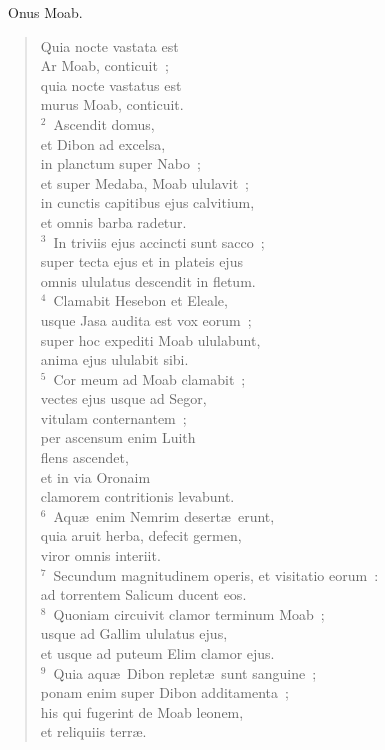 ~Onus Moab. \begin{flushleft}\begin{verse}\vspace{6pt}Quia nocte vastata est\\ Ar Moab, conticuit~;\\ quia nocte vastatus est\\ murus Moab, conticuit.\\
${}^{2}$~Ascendit domus,\\ et Dibon ad excelsa,\\ in planctum super Nabo~;\\ et super Medaba, Moab ululavit~;\\ in cunctis capitibus ejus calvitium,\\ et omnis barba radetur.\\
${}^{3}$~In triviis ejus accincti sunt sacco~;\\ super tecta ejus et in plateis ejus\\ omnis ululatus descendit in fletum.\\
${}^{4}$~Clamabit Hesebon et Eleale,\\ usque Jasa audita est vox eorum~;\\ super hoc expediti Moab ululabunt,\\ anima ejus ululabit sibi.\\
${}^{5}$~Cor meum ad Moab clamabit~;\\ vectes ejus usque ad Segor,\\ vitulam conternantem~;\\ per ascensum enim Luith\\ flens ascendet,\\ et in via Oronaim\\ clamorem contritionis levabunt.\\
${}^{6}$~Aqu\ae\ enim Nemrim desert\ae\ erunt,\\ quia aruit herba, defecit germen,\\ viror omnis interiit.\\
${}^{7}$~Secundum magnitudinem operis, et visitatio eorum~:\\ ad torrentem Salicum ducent eos.\\
${}^{8}$~Quoniam circuivit clamor terminum Moab~;\\ usque ad Gallim ululatus ejus,\\ et usque ad puteum Elim clamor ejus.\\
${}^{9}$~Quia aqu\ae\ Dibon replet\ae\ sunt sanguine~;\\ ponam enim super Dibon additamenta~;\\ his qui fugerint de Moab leonem,\\ et reliquiis terr\ae .\end{verse}\end{flushleft}


